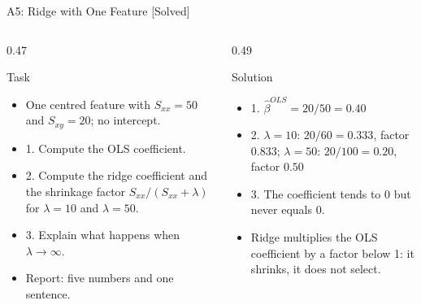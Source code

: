 \begin{frame}{A5: Ridge with One Feature [Solved]}
\itemsize{\scriptsize}
\begin{columns}[T]
\begin{column}{0.47\textwidth}
\begin{block}{Task}
\begin{itemize}
    \item One centred feature with $S_{xx} = 50$ and $S_{xy} = 20$; no intercept.
    \item 1. Compute the OLS coefficient.
    \item 2. Compute the ridge coefficient and the shrinkage factor $S_{xx}/(S_{xx} + \lambda)$ for $\lambda = 10$ and $\lambda = 50$.
    \item 3. Explain what happens when $\lambda \to \infty$.
    \item Report: five numbers and one sentence.
\end{itemize}
\end{block}
\end{column}
\begin{column}{0.49\textwidth}
\begin{exampleblock}{Solution}
\begin{itemize}
    \item 1. $\hat\beta^{OLS} = 20/50 = 0.40$
    \item 2. $\lambda = 10$: $20/60 = 0.333$, factor $0.833$; $\lambda = 50$: $20/100 = 0.20$, factor $0.50$
    \item 3. The coefficient tends to 0 but never equals 0.
    \item Ridge multiplies the OLS coefficient by a factor below 1: it shrinks, it does not select.
\end{itemize}
\end{exampleblock}
\end{column}
\end{columns}
\end{frame}

